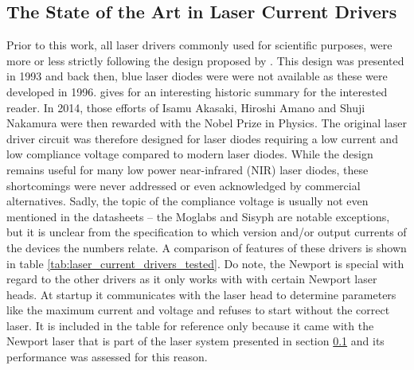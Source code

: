 \subsection{The State of the Art in Laser Current Drivers}
Prior to this work, all laser drivers commonly used for scientific purposes, were more or less strictly following the design proposed by \citeauthor{libbrecht_hall} \cite{libbrecht_hall}. This design was presented in 1993 and back then, blue laser diodes were were not available as these were developed in 1996. \citeauthor{blue_laser_diodes_history} \cite{blue_laser_diodes_history} gives for an interesting historic summary for the interested reader. In 2014, those efforts of Isamu Akasaki, Hiroshi Amano and Shuji Nakamura were then rewarded with the Nobel Prize in Physics. The original laser driver circuit was therefore designed for laser diodes requiring a low current and low compliance voltage compared to modern laser diodes. While the design remains useful for many low power near-infrared (NIR) laser diodes, these shortcomings were never addressed or even acknowledged by commercial alternatives. Sadly, the topic of the compliance voltage is usually not even mentioned in the datasheets -- the Moglabs  and Sisyph  are notable exceptions, but it is unclear from the specification to which version and/or output currents of the devices the numbers relate. A comparison of features of these drivers is shown in table \ref{tab:laser_current_drivers_tested}. Do note, the Newport  is special with regard to the other drivers as it only works with with certain Newport laser heads. At startup it communicates with the laser head to determine parameters like the maximum current and voltage and refuses to start without the correct laser. It is included in the table for reference only because it came with the Newport  laser that is part of the laser system presented in section \ref{} and its performance was assessed for this reason.
